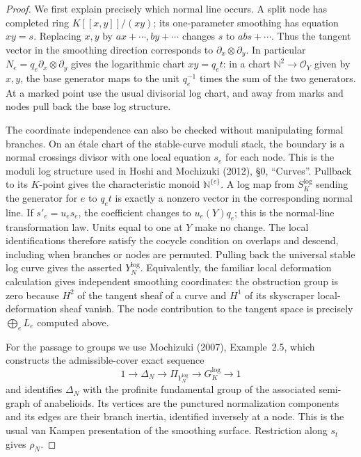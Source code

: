 \begin{proof}
We first explain precisely which normal line occurs. A split node has
completed ring $K[[x,y]]/(xy)$; its one-parameter smoothing has equation
$xy=s$. Replacing $x,y$ by $a x+\cdots,b y+\cdots$ changes $s$ to
$ab s+\cdots$. Thus the tangent vector in the smoothing direction
corresponds to $\partial_x\otimes\partial_y$. In particular
$N_e=q_e\partial_x\otimes\partial_y$ gives the logarithmic chart
$xy=q_e t$: in a chart $\mathbb N^2\to\mathcal O_Y$ given by $x,y$,
the base generator maps to the unit $q_e^{-1}$ times the sum of the
two generators. At a marked point use the usual divisorial log chart,
and away from marks and nodes pull back the base log structure.

The coordinate independence can also be checked without manipulating
formal branches. On an \'etale chart of the stable-curve moduli stack,
the boundary is a normal crossings divisor with one local equation
$s_e$ for each node. This is the moduli log structure used in
Hoshi and Mochizuki (2012), \S0, ``Curves''. Pullback to its $K$-point
gives the characteristic monoid $\mathbb N^{\{e\}}$. A log map from
$S_K^{\log}$ sending the generator for $e$ to $q_e t$ is exactly a
nonzero vector in the corresponding normal line. If
$s'_e=u_e s_e$, the coefficient changes to $u_e(Y)q_e$; this is the
normal-line transformation law. Units equal to one at $Y$ make no
change. The local identifications therefore satisfy the cocycle
condition on overlaps and descend, including when branches or nodes
are permuted. Pulling back the universal stable log curve gives the
asserted $Y_N^{\log}$. Equivalently, the familiar local deformation
calculation gives independent smoothing coordinates: the obstruction
group is zero because $H^2$ of the tangent sheaf of a curve and $H^1$
of its skyscraper local-deformation sheaf vanish. The node contribution
to the tangent space is precisely $\bigoplus_e L_e$ computed above.

For the passage to groups we use Mochizuki (2007), Example~2.5,
which constructs the admissible-cover exact sequence
\[
 1\longrightarrow\Delta_N\longrightarrow\Pi_{Y_N^{\log}}
 \longrightarrow G_K^{\log}\longrightarrow1
\]
and identifies $\Delta_N$ with the profinite fundamental group of the
associated semi-graph of anabelioids. Its vertices are the punctured
normalization components and its edges are their branch inertia,
identified inversely at a node. This is the usual van Kampen
presentation of the smoothing surface. Restriction along $s_t$ gives
$\rho_N$.


\end{proof}
